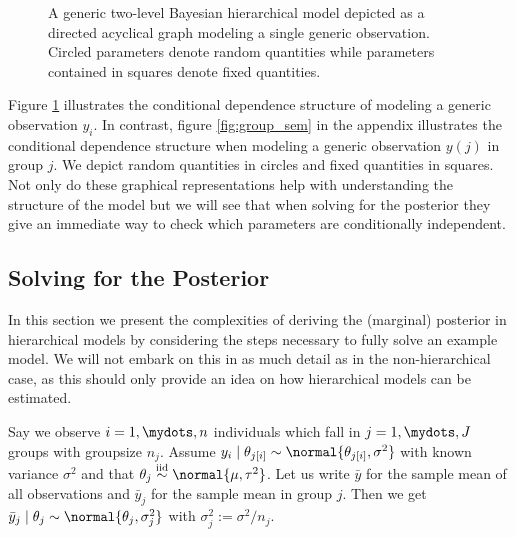 \begin{figure}[!ht]
\begin{center}
\end{center}
\caption{A generic two-level Bayesian hierarchical model depicted as a directed acyclical graph modeling a single generic observation. Circled parameters denote random quantities while parameters contained in squares denote fixed quantities.}
\label{fig:general_sem}
\end{figure}


Figure \ref{fig:general_sem} illustrates the conditional dependence structure of modeling a generic observation $y_i$.
In contrast, figure \ref{fig:group_sem} in the appendix illustrates the conditional dependence structure when modeling a generic observation $y(j)$ in group $j$.
We depict random quantities in circles and fixed quantities in squares.
Not only do these graphical representations help with understanding the structure of the model but we will see that when solving for the posterior they give an immediate way to check which parameters are conditionally independent.

\subsection{Solving for the Posterior}\label{sec:hierachical_solving}
In this section we present the complexities of deriving the (marginal) posterior in hierarchical models by considering the steps necessary to fully solve an example model.
We will not embark on this in as much detail as in the non-hierarchical case, as this should only provide an idea on how hierarchical models can be estimated.

Say we observe $i=1,\mydots,n$ individuals which fall in $j=1,\mydots,J$ groups with groupsize $n_j$.
Assume $y_i \mid \theta_{j[i]} \sim \normal{\theta_{j[i]}, \sigma^2}$ with known variance $\sigma^2$ and that $\theta_j \overset{\text{iid}}{\sim} \normal{\mu, \tau^2}$.
Let us write $\bar{y}$ for the sample mean of all observations and $\bar{y}_j$ for the sample mean in group $j$.
Then we get $\bar{y}_j \mid \theta_j \sim \normal{\theta_j, \sigma_j^2}$ with $\sigma_j^2 := \sigma^2 / n_j$.

